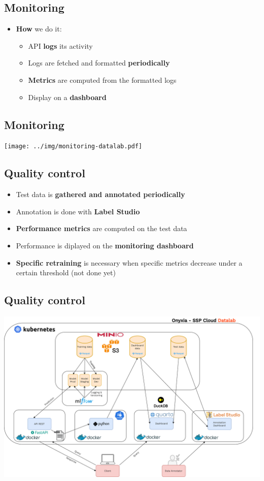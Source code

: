 \documentclass[
  letterpaper,
  DIV=11,
  numbers=noendperiod]{scrartcl}
\providecommand{\tightlist}{%
  \setlength{\itemsep}{0pt}\setlength{\parskip}{0pt}}\usepackage{longtable,booktabs,array}
\begin{document}
\subsection{Monitoring}\label{monitoring-4}

\begin{itemize}
\tightlist
\item
  {\textbf{How}} we do it:

  \begin{itemize}
  \tightlist
  \item
    API {\textbf{logs}} its activity
  \item
    Logs are fetched and formatted {\textbf{periodically}}
  \item
    {\textbf{Metrics}} are computed from the formatted logs
  \item
    Display on a {\textbf{dashboard}}
  \end{itemize}
\end{itemize}

\subsection{Monitoring}\label{monitoring-5}

\begin{center}
\texttt{[image: ../img/monitoring-datalab.pdf]}
\end{center}

\subsection{Quality control}\label{quality-control-2}

\begin{itemize}
\tightlist
\item
  Test data is {\textbf{gathered and annotated periodically}}
\item
  Annotation is done with {\textbf{Label Studio}}
\item
  {\textbf{Performance metrics}} are computed on the test data
\item
  Performance is diplayed on the {\textbf{monitoring dashboard}}
\item
  {\textbf{Specific retraining}} is necessary when specific metrics
  decrease under a certain threshold (not done yet)
\end{itemize}

\subsection{Quality control}\label{quality-control-3}

\begin{center}
\includegraphics{../img/annotation-datalab.png}
\end{center}
\end{document}
